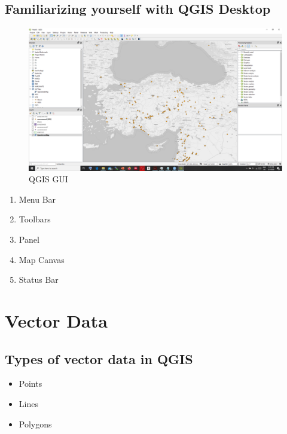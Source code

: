 \documentclass[
]{book}
\providecommand{\tightlist}{%
  \setlength{\itemsep}{0pt}\setlength{\parskip}{0pt}}
\begin{document}
\hypertarget{familiarizing-yourself-with-qgis-desktop}{%
\section{Familiarizing yourself with QGIS Desktop}\label{familiarizing-yourself-with-qgis-desktop}}

\begin{figure}
\centering
\includegraphics{Images/gui.png}
\caption{QGIS GUI}
\end{figure}

\begin{enumerate}
\def\labelenumi{\arabic{enumi}.}
\tightlist
\item
  Menu Bar
\item
  Toolbars
\item
  Panel
\item
  Map Canvas
\item
  Status Bar
\end{enumerate}

\hypertarget{vector-data}{%
\chapter{Vector Data}\label{vector-data}}

\hypertarget{types-of-vector-data-in-qgis}{%
\section{Types of vector data in QGIS}\label{types-of-vector-data-in-qgis}}

\begin{itemize}
\tightlist
\item
  Points
\item
  Lines
\item
  Polygons
\end{itemize}
\end{document}
